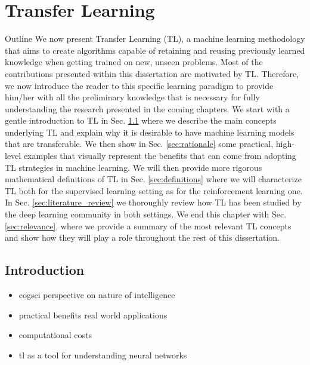\chapter{Transfer Learning}
\label{ch:transfer_learning}

\begin{remark}{Outline}
	We now present Transfer Learning (TL), a machine learning methodology that aims to create algorithms capable of retaining and reusing previously learned knowledge when getting trained on new, unseen problems. Most of the contributions presented within this dissertation are motivated by TL. Therefore, we now introduce the reader to this specific learning paradigm to provide him/her with all the preliminary knowledge that is necessary for fully understanding the research presented in the coming chapters. We start with a gentle introduction to TL in Sec. \ref{sec:tl_introduction} where we describe the main concepts underlying TL and explain why it is desirable to have machine learning models that are transferable. We then show in Sec. \ref{sec:rationale} some practical, high-level examples that visually represent the benefits that can come from adopting TL strategies in machine learning. We will then provide more rigorous mathematical definitions of TL in Sec. \ref{sec:definitions} where we will characterize TL both for the supervised learning setting as for the reinforcement learning one. In Sec. \ref{sec:literature_review} we thoroughly review how TL has been studied by the deep learning community in both settings. We end this chapter with Sec. \ref{sec:relevance}, where we provide a summary of the most relevant TL concepts and show how they will play a role throughout the rest of this dissertation.  
\end{remark}

\section{Introduction}
\label{sec:tl_introduction}

\begin{itemize}
	\item cogsci perspective on nature of intelligence
	\item practical benefits real world applications
	\item computational costs 
	\item tl as a tool for understanding neural networks
\end{itemize}



